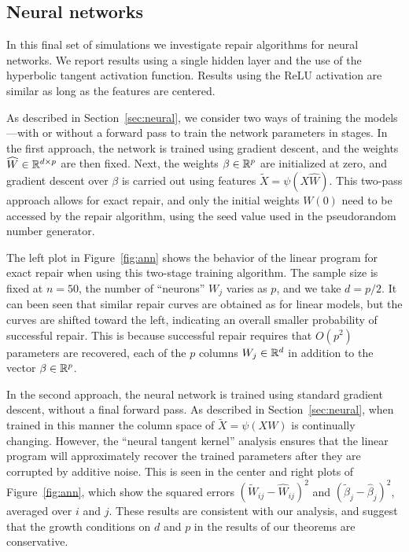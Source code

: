 \subsection{Neural networks}
\vskip10pt

In this final set of simulations we investigate repair algorithms for neural networks. We report results using a single hidden layer and the use of the hyperbolic tangent activation function. Results using the ReLU activation are similar as long as the features are centered.

As described in Section~\ref{sec:neural}, we consider two ways of training the models---with or without a forward pass to train the network parameters in stages. In the first approach, the network is trained using gradient descent, and the weights $\widehat W\in\mathbb{R}^{d\times p}$ are then fixed. Next, the weights $\beta\in\mathbb{R}^p$ are initialized at zero, and gradient descent over $\beta$ is carried out using features
$\tilde X = \psi(X\hat W)$. This two-pass approach allows for exact repair, and only the initial weights $W(0)$ need to be accessed by the repair algorithm, using the seed value used in the pseudorandom number generator.

The left plot in Figure~\ref{fig:ann} shows the behavior of the linear program for exact repair when using this two-stage training algorithm.
The sample size is fixed at $n=50$, the number of ``neurons'' $W_j$ varies as $p$, and we take $d=p/2$. It can been seen that similar repair curves are obtained as for linear models, but the curves are shifted toward the left, indicating an overall smaller probability of successful repair. This is because successful repair requires that
$O(p^2)$ parameters are recovered, each of the $p$ columns $W_j\in\mathbb{R}^d$ in addition to the vector $\beta\in\mathbb{R}^p$.

In the second approach, the neural network is trained using standard gradient descent, without a final forward pass. As described in
Section~\ref{sec:neural}, when trained in this manner the column space of $\tilde X = \psi(X W)$ is continually changing. However,
the ``neural tangent kernel'' analysis ensures that the linear program will approximately recover the trained parameters after they are corrupted by additive noise. This is seen in the center and right plots of Figure~\ref{fig:ann}, which show the
squared errors $(\tilde W_{ij} - \hat W_{ij})^2$ and $(\tilde \beta_j - \hat\beta_j)^2$, averaged over $i$ and $j$. These results are consistent with our analysis, and suggest that the growth conditions on $d$ and $p$ in the results of our theorems are conservative.
